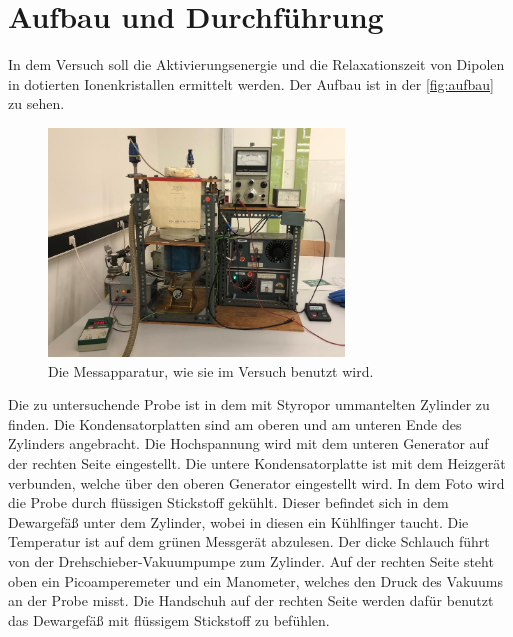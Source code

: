 \section{Aufbau und Durchführung}
\label{sec:Durchführung}

    \noindent In dem Versuch soll die Aktivierungsenergie und die Relaxationszeit von Dipolen in dotierten Ionenkristallen ermittelt werden. 
    Der Aufbau ist in der \autoref{fig:aufbau} zu sehen. 
    \begin{figure}[h]
        \centering
        \includegraphics[width=0.7\textwidth]{bilder/foto_aufbau.png}
        \caption{Die Messapparatur, wie sie im Versuch benutzt wird. \cite{anleitung}}
        \label{fig:aufbau}
    \end{figure}
    Die zu untersuchende Probe ist in dem mit Styropor ummantelten Zylinder zu finden. Die Kondensatorplatten sind am oberen und am unteren Ende des Zylinders 
    angebracht. Die Hochspannung wird mit dem unteren Generator auf der rechten Seite eingestellt. Die untere Kondensatorplatte ist mit dem Heizgerät verbunden, welche über den 
    oberen Generator eingestellt wird. In dem Foto wird die Probe durch flüssigen Stickstoff gekühlt. Dieser befindet sich in dem Dewargefäß unter dem Zylinder, wobei 
    in diesen ein Kühlfinger taucht. Die Temperatur ist auf dem grünen Messgerät abzulesen. Der dicke Schlauch führt von der Drehschieber-Vakuumpumpe 
    zum Zylinder. Auf der rechten Seite steht oben ein Picoamperemeter und ein Manometer, welches den Druck des Vakuums an der Probe misst. 
    Die Handschuh auf der rechten Seite werden dafür benutzt das Dewargefäß mit flüssigem Stickstoff zu befühlen. 

